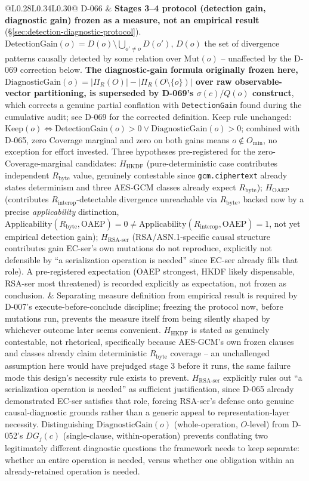 \documentclass[11pt,a4paper]{article}
\begin{document}
\begin{longtable}{@{}L{0.28\textwidth}L{0.34\textwidth}L{0.30\textwidth}@{}}
D-066 & \textbf{Stages 3--4 protocol (detection gain, diagnostic gain) frozen as a measure, not an empirical result} (\S\ref{sec:detection-diagnostic-protocol}). $\text{DetectionGain}(o) = D(o)\setminus\bigcup_{o'\neq o}D(o')$, $D(o)$ the set of divergence patterns causally detected by some relation over $\text{Mut}(o)$ -- unaffected by the D-069 correction below. \textbf{The diagnostic-gain formula originally frozen here, $\text{DiagnosticGain}(o) = |\Pi_R(O)|-|\Pi_R(O\setminus\{o\})|$ over raw observable-vector partitioning, is superseded by D-069's $\sigma(c)/Q(o)$ construct}, which corrects a genuine partial conflation with \texttt{DetectionGain} found during the cumulative audit; see D-069 for the corrected definition. Keep rule unchanged: $\text{Keep}(o)\iff\text{DetectionGain}(o)>0\vee\text{DiagnosticGain}(o)>0$; combined with D-065, zero Coverage marginal and zero on both gains means $o\notin O_{\min}$, no exception for effort invested. Three hypotheses pre-registered for the zero-Coverage-marginal candidates: $H_{\text{HKDF}}$ (pure-deterministic case contributes independent $R_{\text{byte}}$ value, genuinely contestable since \texttt{gcm.ciphertext} already states determinism and three AES-GCM classes already expect $R_{\text{byte}}$); $H_{\text{OAEP}}$ (contributes $R_{\text{interop}}$-detectable divergence unreachable via $R_{\text{byte}}$, backed now by a precise \emph{applicability} distinction, $\text{Applicability}(R_{\text{byte}},\text{OAEP})=0 \neq \text{Applicability}(R_{\text{interop}},\text{OAEP})=1$, not yet empirical detection gain); $H_{\text{RSA-ser}}$ (RSA/ASN.1-specific causal structure contributes gain EC-ser's own mutations do not reproduce, explicitly not defensible by ``a serialization operation is needed'' since EC-ser already fills that role). A pre-registered expectation (OAEP strongest, HKDF likely dispensable, RSA-ser most threatened) is recorded explicitly as expectation, not frozen as conclusion. & Separating measure definition from empirical result is required by D-007's execute-before-conclude discipline; freezing the protocol now, before mutations run, prevents the measure itself from being silently shaped by whichever outcome later seems convenient. $H_{\text{HKDF}}$ is stated as genuinely contestable, not rhetorical, specifically because AES-GCM's own frozen clauses and classes already claim deterministic $R_{\text{byte}}$ coverage -- an unchallenged assumption here would have prejudged stage 3 before it runs, the same failure mode this design's necessity rule exists to prevent. $H_{\text{RSA-ser}}$ explicitly rules out ``a serialization operation is needed'' as sufficient justification, since D-065 already demonstrated EC-ser satisfies that role, forcing RSA-ser's defense onto genuine causal-diagnostic grounds rather than a generic appeal to representation-layer necessity. Distinguishing $\text{DiagnosticGain}(o)$ (whole-operation, $O$-level) from D-052's $DG_j(c)$ (single-clause, within-operation) prevents conflating two legitimately different diagnostic questions the framework needs to keep separate: whether an entire operation is needed, versus whether one obligation within an already-retained operation is needed.\\

\end{longtable}
\end{document}
